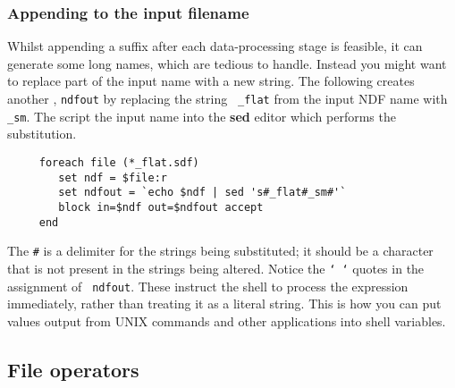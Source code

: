 \subsubsection{Appending to the input
filename\label{sc4_se_filename_substitution}}

Whilst appending a suffix after each data-processing stage is
feasible, it can generate some long names, which are tedious to
handle.  Instead you might want to replace part of the input name with
a new string.  The following creates another , {\tt ndfout} by replacing the string {\tt
\_flat} from the input NDF name with {\tt \_sm}.  The script
 the input name into the {\bf sed}
editor which performs the substitution. 

\small
\begin{verbatim}
     foreach file (*_flat.sdf)
        set ndf = $file:r
        set ndfout = `echo $ndf | sed 's#_flat#_sm#'`
        block in=$ndf out=$ndfout accept
     end
\end{verbatim}
\normalsize
The {\tt \#} is a delimiter for the strings being substituted; it
should be a character that is not present in the strings being
altered.  Notice the {\tt ` `} quotes in the assignment of {\tt
ndfout}.  These instruct the shell to process the expression
immediately, rather than treating it as a literal string.  This is how
you can put values output from UNIX commands and other applications into
shell variables.

\subsection{File operators
\label{sc4_se_file_operators}}

